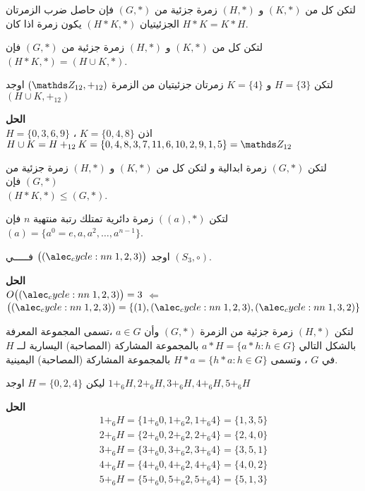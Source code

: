  \begin{theorem}
 		لتكن كل من $(K, *)$ و $(H, *)$ زمرة جزئية من $(G, *)$ فإن حاصل ضرب الزمرتان الجزئيتيان $(H*K, *)$ يكون زمرة اذا كان $H*K=K*H$.
 \end{theorem}
 
 \begin{note}
 		لتكن كل من $(K, *)$ و $(H, *)$ زمرة جزئية من $(G, *)$ فإن $(H*K, *) = (H\cup K, *)$.
 \end{note}
 
 \begin{example}
 	لتكن $H=\{3\}$  و $K=\{4\}$ زمرتان جزئيتيان من الزمرة $(\Z_{12}, +_{12})$ اوجد 
 	$(H\cup K, +_{12})$
 \end{example}
 \noindent
 \textbf{الحل}\\
 \noindent
 $H = \{0,3,6,9\}$ ، $K=\{0,4,8\} $ اذن \\
 $H \cup K = H+_{12} K = \{0,4,8,3,7,11,6,10,2,9,1,5\} = \Z_{12}$

 \begin{theorem}
 	لتكن $(G, *)$ زمرة ابدالية و	لتكن كل من $(K, *)$ و $(H, *)$ زمرة جزئية من $(G, *)$ فإن\\
 	 $(H*K, *) \leq (G, *)$.
 \end{theorem}
 
 \begin{theorem}
 	لتكن $((a), *)$ زمرة دائرية تمتلك رتبة منتهية $n$ فإن 
 	$(a) = \{a^0 = e, a, a^2, \dots, a^{n-1}\}$.
 \end{theorem}
 
 
 \begin{example}
 	اوجد $\big(\cycle{1,2,3}\big)$ فـــــي $(S_3, \circ)$.
 \end{example}
 \noindent
 \textbf{الحل}\\
 \noindent
 $O\big(\cycle{1,2,3}\big) = 3$ $\Leftarrow$ $\big(\cycle{1,2,3}\big) = \{(1), \cycle{1,2,3} , \cycle{1,3,2}\}$
 
 \begin{definition}
 	لتكن $(H, *)$ زمرة جزئية من الزمرة $(G, *)$ وأن $a\in G$ ،تسمى  المجموعة المعرفة بالشكل التالي 
 	$a* H = \{a * h : h\in G\}$
 	بالمجموعة المشاركة (المصاحبة)  اليسارية لــ $H$ في $G$  ، وتسمى $H*a = \{h*a:h\in G\}$ بالمجموعة المشاركة (المصاحبة) اليمينية.  
 \end{definition}
 
 \begin{example}
 	ليكن $H=\{0,2,4\}$ اوجد
 	 $1+_{6} H, 2+_{6} H, 3 +_{6} H, 4+_6 H, 5+_6 H$
 \end{example}
 \noindent
 \textbf{الحل}
 \begin{gather*}
 	1 +_{6} H =\{1 +_6 0, 1 +_6 2, 1 +_6 4\} = \{1,3,5\}\\
 	2 +_{6} H = \{2 +_6 0, 2 +_6 2, 2 +_6 4\} = \{2,4,0\}\\
 	3 +_{6} H = \{3 +_6 0, 3 +_6 2, 3 +_6 4\} =\{3,5,1\}\\
  	4 +_{6} H =\{4+_6 0, 4+_6 2, 4 +_6 4\} = \{4,0,2\}\\
   	5 +_{6} H = \{5 +_6 0, 5 +_6 2, 5 +_6 4\} =\{5,1,3\}
 \end{gather*}
 
